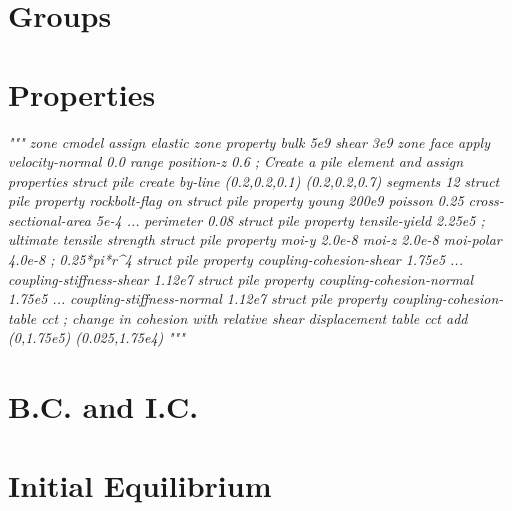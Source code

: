 \documentclass[a4paper, nobind]{templates/ociamthesis}
\newenvironment{Shaded}{\begin{snugshade}}{\end{snugshade}}
\newcommand{\CommentTok}[1]{\textcolor[rgb]{0.56,0.35,0.01}{\textit{#1}}}
\renewenvironment{Shaded}
{
  \vspace{10pt}%
  \begin{snugshade}%
}{%
  \end{snugshade}%
  \vspace{8pt}%
}
\begin{document}
\hypertarget{groups-2}{%
\section{Groups}\label{groups-2}}

\hypertarget{properties-2}{%
\section{Properties}\label{properties-2}}

\begin{Shaded}
\begin{Highlighting}[]
\CommentTok{"""}
\CommentTok{zone cmodel assign elastic}
\CommentTok{zone property bulk 5e9 shear 3e9}
\CommentTok{zone face apply velocity{-}normal 0.0 range position{-}z 0.6}
\CommentTok{; Create a pile element and assign properties}
\CommentTok{struct pile create by{-}line (0.2,0.2,0.1) (0.2,0.2,0.7) segments 12}
\CommentTok{struct pile property rockbolt{-}flag on}
\CommentTok{struct pile property young 200e9 poisson 0.25 cross{-}sectional{-}area 5e{-}4 ...}
\CommentTok{                     perimeter 0.08}
\CommentTok{struct pile property tensile{-}yield   2.25e5  ; ultimate tensile strength}
\CommentTok{struct pile property moi{-}y 2.0e{-}8 moi{-}z 2.0e{-}8 moi{-}polar 4.0e{-}8 ; 0.25*pi*r\^{}4}
\CommentTok{struct pile property coupling{-}cohesion{-}shear 1.75e5 ...}
\CommentTok{                     coupling{-}stiffness{-}shear 1.12e7}
\CommentTok{struct pile property coupling{-}cohesion{-}normal 1.75e5 ...}
\CommentTok{                     coupling{-}stiffness{-}normal 1.12e7}
\CommentTok{struct pile property coupling{-}cohesion{-}table \textquotesingle{}cct\textquotesingle{}}
\CommentTok{; change in cohesion with relative shear displacement}
\CommentTok{table \textquotesingle{}cct\textquotesingle{} add (0,1.75e5) (0.025,1.75e4)}
\CommentTok{"""}
\end{Highlighting}
\end{Shaded}

\hypertarget{b.c.-and-i.c.-1}{%
\section{B.C. and I.C.}\label{b.c.-and-i.c.-1}}

\hypertarget{initial-equilibrium-1}{%
\section{Initial Equilibrium}\label{initial-equilibrium-1}}
\end{document}

